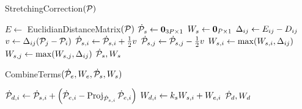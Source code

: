 \begin{algorithm}[ht]
\caption{StretchingCorrection$(\mathcal{P})$}
\begin{algorithmic}[1]
    \State $E \gets$ EuclidianDistanceMatrix$(\mathcal{P})$
    \State $\dot{\mathcal{P}}_s \gets \mathbf{0}_{{3P} \times 1}$
    \State $W_s \gets \mathbf{0}_{P \times 1}$
                \State $\Delta_{i j} \gets E_{i j} - D_{i j}$
                \State $v \gets \Delta_{i j}(\mathcal{P}_j - \mathcal{P}_i)$
                \State $\dot{\mathcal{P}}_{s,i} \gets \dot{\mathcal{P}}_{s,i} + \frac{1}{2}v$
                \State $\dot{\mathcal{P}}_{s,j} \gets \dot{\mathcal{P}}_{s,j} - \frac{1}{2}v$
                \State $W_{s,i} \gets \max (W_{s,i}, \Delta_{i j})$
                \State $W_{s,j} \gets \max (W_{s,j}, \Delta_{i j})$
            \EndIf
        \EndFor
    \EndFor
    \State \Return $\dot{\mathcal{P}}_s, W_s$
\end{algorithmic}
\label{alg:stretching_correction_ijrr}
\end{algorithm}

\begin{algorithm}[ht]
\caption{CombineTerms$(\dot{\mathcal{P}}_e, W_e, \dot{\mathcal{P}}_s, W_s)$}
\begin{algorithmic}[1]
        \State $\dot{\mathcal{P}}_{d,i} \gets \dot{\mathcal{P}}_{s,i} + \left( \dot{\mathcal{P}}_{e,i} - \operatorname*{Proj}_{\dot{\mathcal{P}}_{s,i}} \dot{\mathcal{P}}_{e,i} \right)$
        \State $W_{d,i} \gets k_s W_{s,i} + W_{e,i}$
    \EndFor
    \State \Return $\dot{\mathcal{P}}_d, W_d$
\end{algorithmic}
\label{alg:combine_terms}
\end{algorithm}


